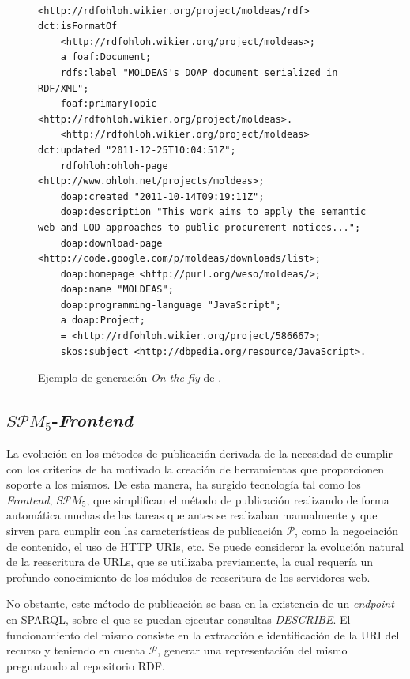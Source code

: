 \begin{figure}[!htp]
\begin{lstlisting}

<http://rdfohloh.wikier.org/project/moldeas/rdf> dct:isFormatOf 
	<http://rdfohloh.wikier.org/project/moldeas>;
	a foaf:Document;
	rdfs:label "MOLDEAS's DOAP document serialized in RDF/XML";
	foaf:primaryTopic <http://rdfohloh.wikier.org/project/moldeas>.
	<http://rdfohloh.wikier.org/project/moldeas> dct:updated "2011-12-25T10:04:51Z";
	rdfohloh:ohloh-page <http://www.ohloh.net/projects/moldeas>;
	doap:created "2011-10-14T09:19:11Z";
	doap:description "This work aims to apply the semantic web and LOD approaches to public procurement notices...";
	doap:download-page <http://code.google.com/p/moldeas/downloads/list>;
	doap:homepage <http://purl.org/weso/moldeas/>;
	doap:name "MOLDEAS";
	doap:programming-language "JavaScript";
	a doap:Project;
	= <http://rdfohloh.wikier.org/project/586667>;
	skos:subject <http://dbpedia.org/resource/JavaScript>.

\end{lstlisting}
	\caption{Ejemplo de generación \textit{On-the-fly} de \linkeddata.}
	\label{fig:moldeas-ohloh}
\end{figure}

\subsection{$S\mathcal{P}M_{5}$-\linkeddata \textit{Frontend}}\label{linkeddata-frontend}
La evolución en los métodos de publicación derivada de la necesidad de cumplir
con los criterios de \linkeddata ha motivado la creación de herramientas
que proporcionen soporte a los mismos. De esta manera, ha surgido tecnología tal como
los \linkeddata \textit{Frontend}, $S\mathcal{P}M_{5}$, que simplifican el método de publicación
realizando de forma automática muchas de las tareas que antes se realizaban manualmente y que sirven para cumplir con las características de publicación $\mathcal{P}$, 
como la negociación de contenido, el uso de HTTP URIs, etc. Se puede considerar
la evolución natural de la reescritura de URLs, que se utilizaba previamente, la cual requería un profundo conocimiento 
de los módulos de reescritura de los servidores web.

No obstante, este método de publicación se basa en la existencia de un \textit{endpoint}
en \gls{SPARQL}, sobre el que se puedan ejecutar consultas \textit{DESCRIBE}. El funcionamiento del mismo 
consiste en la extracción e identificación de la \gls{URI} del recurso y teniendo en cuenta $\mathcal{P}$, generar 
una representación del mismo preguntando al repositorio \gls{RDF}. 

